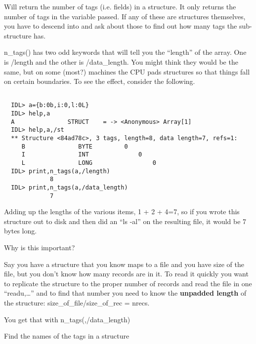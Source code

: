        
       Will return the number of tags (i.e. fields) in a structure. It
       only returns the number of tags in the variable passed. If any
       of these are structures themselves, you have to descend into
       and ask about those to find out how many tags the sub-structure
       has.
       
       n\_tags() has two odd keywords that will tell you the
       ``length'' of the array. One is /length and the other is
       /data\_length.  You might think they would be the same, but on
       some (most?)  machines the CPU pads structures so that things
       fall on certain boundaries. To see the effect, consider the
       following.

       \begin{IDLExample}\begin{verbatim}

  IDL> a={b:0b,i:0,l:0L}
  IDL> help,a
  A               STRUCT    = -> <Anonymous> Array[1]
  IDL> help,a,/st
  ** Structure <84ad78c>, 3 tags, length=8, data length=7, refs=1:
     B               BYTE         0
     I               INT              0
     L               LONG                 0
  IDL> print,n_tags(a,/length)
             8
  IDL> print,n_tags(a,/data_length)
             7
\end{verbatim}\end{IDLExample}
           
           Adding up the lengths of the various items, 1 + 2 + 4=7, so
           if you wrote this structure out to disk and then did an
           ``ls -al'' on the resulting file, it would be 7 bytes long.

     Why is this important? 
     
     Say you have a structure that you know maps to a file and you
     have size of the file, but you don't know how many records are in
     it. To read it quickly you want to replicate the structure to the
     proper number of records and read the file in one
     ``readu,\ldots'' and to find that number you need to know the 
     \textbf{unpadded length} of the structure: size\_of\_file/size\_of\_rec = nrecs.

     You get that with n\_tags(,/data\_length)

     \item Find the names of the tags in a structure

     
